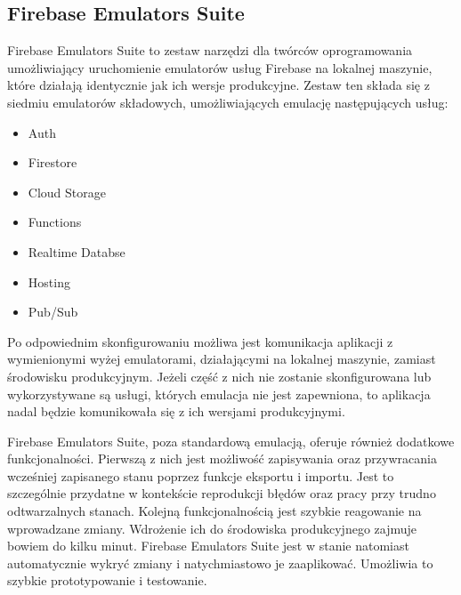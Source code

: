 \subsection{Firebase Emulators Suite}
Firebase Emulators Suite to zestaw  narzędzi dla twórców oprogramowania umożliwiający uruchomienie emulatorów usług Firebase na lokalnej maszynie, które działają identycznie jak ich wersje produkcyjne. Zestaw ten składa się z siedmiu emulatorów składowych, umożliwiających emulację następujących usług:

\begin{multicols}{2}
    \begin{itemize}
        \item Auth
        \item Firestore
        \item Cloud Storage
        \item Functions
        \item Realtime Databse
        \item Hosting
        \item Pub/Sub
    \end{itemize}
\end{multicols}

Po odpowiednim skonfigurowaniu możliwa jest komunikacja aplikacji z wymienionymi wyżej emulatorami, działającymi na lokalnej maszynie, zamiast środowisku produkcyjnym. Jeżeli część z nich nie zostanie skonfigurowana lub wykorzystywane są usługi, których emulacja nie jest zapewniona, to aplikacja nadal będzie komunikowała się z ich wersjami produkcyjnymi.

Firebase Emulators Suite, poza standardową emulacją, oferuje również dodatkowe funkcjonalności. Pierwszą z nich jest możliwość zapisywania oraz przywracania wcześniej zapisanego stanu poprzez funkcje eksportu i importu. Jest to szczególnie przydatne w kontekście reprodukcji błędów oraz pracy przy trudno odtwarzalnych stanach. Kolejną funkcjonalnością jest szybkie reagowanie na wprowadzane zmiany. Wdrożenie ich do środowiska produkcyjnego zajmuje bowiem do kilku minut. Firebase Emulators Suite jest w stanie natomiast automatycznie wykryć zmiany i natychmiastowo je zaaplikować. Umożliwia to szybkie prototypowanie i testowanie.



